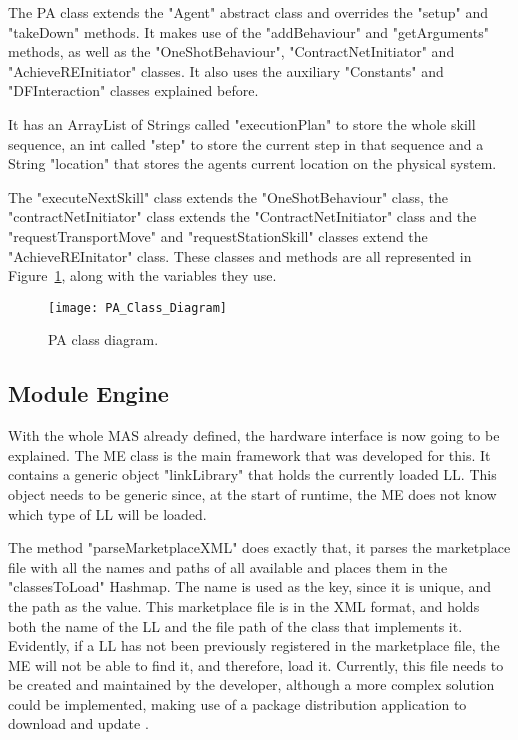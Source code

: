 The \acrlong{PA} class extends the "Agent" abstract class and overrides the "setup" and "takeDown" methods. It makes use of the "addBehaviour" and "getArguments" methods, as well as the "OneShotBehaviour", "ContractNetInitiator" and "AchieveREInitiator" classes. It also uses the auxiliary "Constants" and "DFInteraction" classes explained before.

It has an ArrayList of Strings called "executionPlan" to store the whole skill sequence, an int called "step" to store the current step in that sequence and a String "location" that stores the agents current location on the physical system.

The "executeNextSkill" class extends the "OneShotBehaviour" class, the "contractNetInitiator" class extends the "ContractNetInitiator" class and the "requestTransportMove" and "requestStationSkill" classes extend the "AchieveREInitator" class. These classes and methods are all represented in Figure~\ref{fig:pa_class_diagram}, along with the variables they use.

\begin{figure}[h!]
	\centering
	\texttt{[image: PA\_Class\_Diagram]}
	\caption{\acrlong{PA} class diagram.}
	\label{fig:pa_class_diagram}
\end{figure}

\subsection{Module Engine}
\label{subsec:module_engine}

With the whole \acrshort{MAS} already defined, the hardware interface is now going to be explained. The \acrlong{ME} class is the main framework that was developed for this. It contains a generic object "linkLibrary" that holds the currently loaded \acrlong{LL}. This object needs to be generic since, at the start of runtime, the \acrshort{ME} does not know which type of \acrshort{LL} will be loaded.

The method "parseMarketplaceXML" does exactly that, it parses the marketplace file with all the names and paths of all available  and places them in the "classesToLoad" Hashmap. The name is used as the key, since it is unique, and the path as the value. This marketplace file is in the \acrshort{XML} format, and holds both the name of the \acrshort{LL} and the file path of the class that implements it. Evidently, if a \acrlong{LL} has not been previously registered in the marketplace file, the \acrlong{ME} will not be able to find it, and therefore, load it. Currently, this file needs to be created and maintained by the developer, although a more complex solution could be implemented, making use of a package distribution application to download and update .

